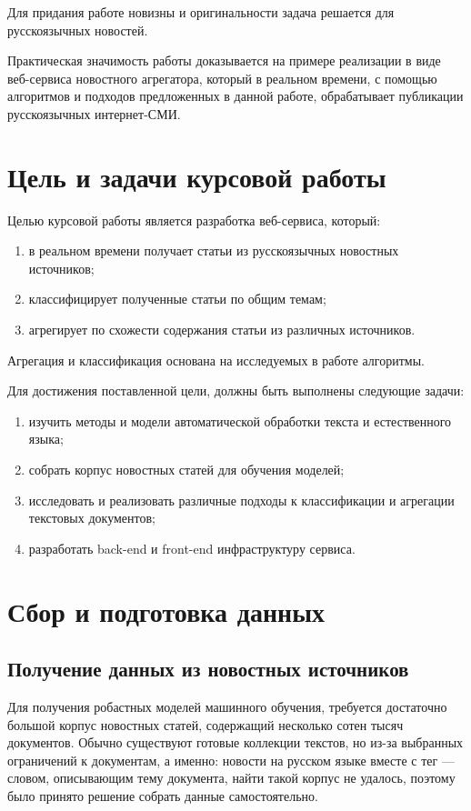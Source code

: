 \documentclass[a4paper, 14pt]{extarticle}
\begin{document}
Для придания работе новизны и оригинальности задача решается для русскоязычных новостей.

Практическая значимость работы доказывается на примере реализации в виде веб-сервиса новостного агрегатора,
который в реальном времени, с помощью алгоритмов и подходов предложенных в данной работе,
обрабатывает публикации русскоязычных интернет-СМИ.

\section{Цель и задачи курсовой работы}
Целью курсовой работы является разработка веб-сервиса, который:
\begin{enumerate}
	\item в реальном времени получает статьи из русскоязычных новостных источников;
	\item классифицирует полученные статьи по общим темам;
	\item агрегирует по схожести содержания статьи из различных источников.
\end{enumerate}
Агрегация и классификация основана на исследуемых в работе алгоритмы.

Для достижения поставленной цели, должны быть выполнены следующие задачи:
\begin{enumerate}
	\item изучить методы и модели автоматической обработки текста и естественного языка;
	\item собрать корпус новостных статей для обучения моделей;
	\item исследовать и реализовать различные подходы к классификации и агрегации текстовых документов;
	\item разработать back-end и front-end инфраструктуру сервиса.
\end{enumerate}

\section{Сбор и подготовка данных}
\subsection{Получение данных из новостных источников}
Для получения робастных моделей машинного обучения, требуется достаточно большой корпус новостных статей,
содержащий несколько сотен тысяч документов. Обычно существуют готовые коллекции текстов, но из-за выбранных 
ограничений к документам, а именно: новости на русском языке вместе с тег --- словом, описывающим тему 
документа, найти такой корпус не удалось, поэтому было принято решение собрать данные самостоятельно.
\end{document}
